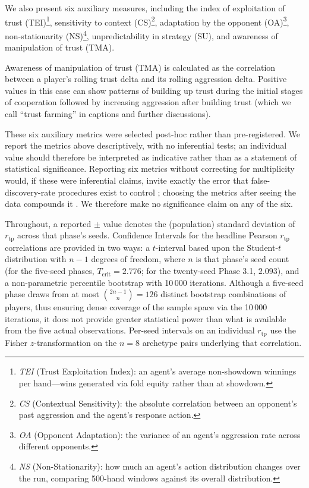 \documentclass[10pt,twocolumn,letterpaper]{article}
\newcommand{\rtp}{\ensuremath{r_{\mathrm{tp}}}}
\begin{document}
We also present six auxiliary measures, including the index of
exploitation of trust (TEI)\footnote{\textit{TEI} (Trust Exploitation Index): an agent's average
non-showdown winnings per hand---wins generated via fold equity
rather than at showdown.},
sensitivity to context (CS)\footnote{\textit{CS} (Contextual Sensitivity): the absolute correlation
between an opponent's past aggression and the agent's response
action.}, adaptation by the opponent
(OA)\footnote{\textit{OA} (Opponent Adaptation): the variance of an agent's
aggression rate across different opponents.},
non-stationarity (NS)\footnote{\textit{NS} (Non-Stationarity): how much an agent's action
distribution changes over the run, comparing 500-hand windows against
its overall distribution.},
unpredictability in strategy (SU), and awareness of manipulation of
trust (TMA).

Awareness of manipulation of trust (TMA) is calculated as the
correlation between a player's rolling trust delta and its rolling
aggression delta. Positive values in this case can show patterns of
building up trust during the initial stages of cooperation followed
by increasing aggression after building trust (which we call ``trust
farming'' in captions and further discussions).

These six auxiliary metrics were selected post-hoc rather than
pre-registered. We report the metrics above descriptively, with no inferential
tests; an individual value should therefore be interpreted as
indicative rather than as a statement of statistical significance.
Reporting six metrics without correcting for multiplicity would, if
these were inferential claims, invite exactly the error that
false-discovery-rate procedures exist to control
\citep{benjamini1995controlling}; choosing the metrics after seeing
the data compounds it \citep{gelman2014statistical}. We therefore
make no significance claim on any of the six.

Throughout, a reported $\pm$ value denotes the (population) standard deviation of $\rtp$ across that phase's seeds. Confidence Intervals for the headline Pearson $\rtp$ correlations are
provided in two ways: a $t$-interval based upon the Student-$t$
distribution with $n-1$ degrees of freedom, where $n$ is that
phase's seed count (for the five-seed phases, $T_{\text{crit}} =
2.776$; for the twenty-seed Phase 3.1, $2.093$), and a non-parametric
percentile bootstrap \citep{efron1979bootstrap} with 10\,000
iterations. Although a five-seed phase draws from at most $\binom{2n-1}{n} = 126$ distinct bootstrap combinations of players,
thus ensuring dense coverage of the sample space via the 10\,000
iterations, it does not provide greater statistical power than what
is available from the five actual observations. Per-seed intervals
on an individual $\rtp$ use the Fisher $z$-transformation
\citep{fisher1921probable} on the $n=8$ archetype pairs underlying
that correlation.
\end{document}
